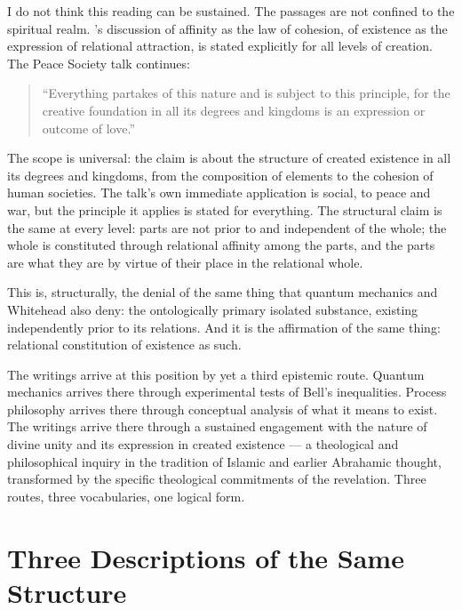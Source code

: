 I do not think this reading can be sustained. The passages are not confined to the spiritual realm. \AbdulBaha's discussion of affinity as the law of cohesion, of existence as the expression of relational attraction, is stated explicitly for all levels of creation. The Peace Society talk continues:

\begin{quote}
``Everything partakes of this nature and is subject to this principle, for the creative foundation in all its degrees and kingdoms is an expression or outcome of love.''
\citep[Talk 48]{PUP}
\end{quote}

The scope is universal: the claim is about the structure of created existence in all its degrees and kingdoms, from the composition of elements to the cohesion of human societies. The talk's own immediate application is social, to peace and war, but the principle it applies is stated for everything. The structural claim is the same at every level: parts are not prior to and independent of the whole; the whole is constituted through relational affinity among the parts, and the parts are what they are by virtue of their place in the relational whole.

This is, structurally, the denial of the same thing that quantum mechanics and Whitehead also deny: the ontologically primary isolated substance, existing independently prior to its relations. And it is the affirmation of the same thing: relational constitution of existence as such.

The \bahai writings arrive at this position by yet a third epistemic route. Quantum mechanics arrives there through experimental tests of Bell's inequalities. Process philosophy arrives there through conceptual analysis of what it means to exist. The \bahai writings arrive there through a sustained engagement with the nature of divine unity and its expression in created existence --- a theological and philosophical inquiry in the tradition of Islamic and earlier Abrahamic thought, transformed by the specific theological commitments of the \bahai revelation. Three routes, three vocabularies, one logical form.

\section{Three Descriptions of the Same Structure}
\label{sec:ch7-convergence}

